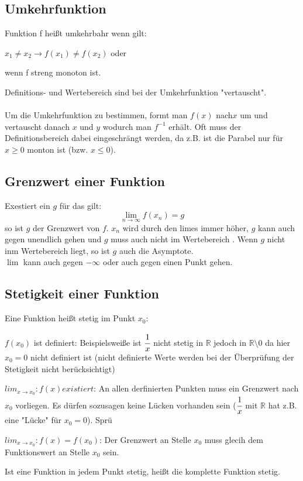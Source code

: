 \documentclass[a4paper]{scrartcl}
\begin{document}
    \subsection{Umkehrfunktion}
    Funktion f heißt umkehrbahr wenn gilt:     
    \begin{description}
        \item $x_1 \neq x_2 \rightarrow f(x_1) \neq f(x_2)$ oder
        \item wenn f streng monoton ist.
        \end{description}
    Definitions- und Wertebereich sind bei der Umkehrfunktion "vertauscht". \\  
    \\ Um die Umkehrfunktion zu bestimmen, formt man $f(x)$ nach$x$ um und vertauscht danach $x$ und $y$ wodurch man $f^{-1}$ erhält.
    Oft muss der Definitionsbereich dabei eingeschrängt werden, da z.B. ist die Parabel nur für $x \geq 0$ monton ist (bzw. $x \leq 0$). 

    \subsection{Grenzwert einer Funktion}
    Exestiert ein $g$ für das gilt:
    \begin{equation*}
        \lim \limits_{n \to \infty}f(x_n) = g
    \end{equation*} 
    so ist $g$ der Grenzwert von $f$.
    $x_n$ wird durch den limes immer höher, $g$ kann auch gegen unendlich gehen und $g$ muss auch nicht im Wertebereich . Wenn $g$ nicht inm Wertebereich liegt, so ist $g$ auch die Asymptote. \\
    $\lim$ kann auch gegen $-\infty$ oder auch gegen einen Punkt gehen.

    \subsection{Stetigkeit einer Funktion}
        Eine Funktion heißt stetig im Punkt $x_0$:
        \begin{description}
            \item $f(x_0)$ ist definiert: Beispielsweiße ist $\cfrac{1}{x}$ nicht stetig in $\mathbb{R}$ jedoch in $\mathbb{R} \setminus 0$ da hier $x_0 = 0$ nicht definiert ist (nicht definierte Werte werden bei der Überprüfung der Stetigkeit nicht berücksichtigt)
            \item $lim_{x \to x_0}: f(x) existiert$: An allen derfinierten Punkten muss ein Grenzwert nach $x_0$ vorliegen. Es dürfen sozusagen keine Lücken vorhanden sein ($\cfrac{1}{x}$ mit $\mathbb{R}$ hat z.B. eine "Lücke" für $x_0 = 0$). Sprü
            \item $lim_{x \to x_0}: f(x) = f(x_0)$: Der Grenzwert an Stelle $x_0$ muss glecih dem Funktionswert an Stelle $x_0$ sein.
        \end{description}
        Ist eine Funktion in jedem Punkt stetig, heißt die komplette Funktion stetig.
\end{document}
